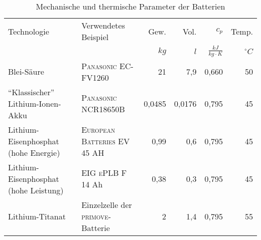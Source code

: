 \begin{table}\centering
	\begin{tabulary}{\textwidth}{LLRRRR}
		\toprule
		Technologie                           & Verwendetes Beispiel                      &   Gew. &   Vol. &                  $c_p$ &       Temp. \\
		                                      &                                           &   $kg$ &    $l$ & $\frac{kJ}{kg\cdot K}$ & $^{\circ}C$ \\ \midrule
		Blei-Säure                            & \textsc{Panasonic} EC-FV1260              &     21 &    7,9 &                  0,660 &          50 \\
		"`Klassischer"' Lithium-Ionen-Akku    & \textsc{Panasonic} NCR18650B              & 0,0485 & 0,0176 &                  0,795 &          45 \\
		Lithium-Eisenphosphat (hohe Energie)  & \textsc{European Batteries} EV 45 AH      &   0,99 &    0,6 &                  0,795 &          45 \\
		Lithium-Eisenphosphat (hohe Leistung) & \textsc{EIG ePLB} F 14 Ah                 &   0,38 &    0,3 &                  0,795 &          45 \\
		Lithium-Titanat                       & Einzelzelle der \textsc{primove}-Batterie &      2 &    1,4 &                  0,795 &          55 \\ \bottomrule
	\end{tabulary}
	\caption{Mechanische und thermische Parameter der Batterien}
	\label{vergleichstabellen_speichertechnologien_2}
\end{table}

